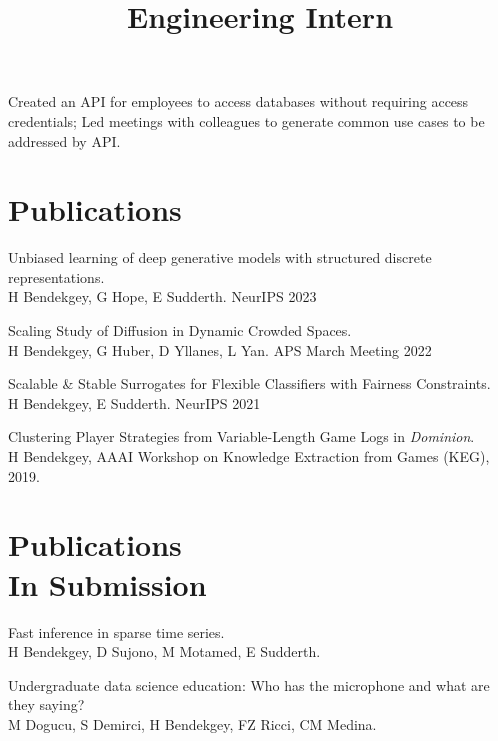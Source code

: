 \documentclass[margin]{res}
\begin{document}
\begin{resume}
\location{}
\title{\textbf{Engineering Intern}}
\begin{position}
Created an API for employees to access databases without requiring access credentials;
Led meetings with colleagues to generate common use cases to be addressed by API.\end{position}



\section{Publications}
\par
Unbiased learning of deep generative models with structured discrete \\representations. \\ H Bendekgey, G Hope, E Sudderth. NeurIPS 2023

Scaling Study of Diffusion in Dynamic Crowded Spaces. \\H Bendekgey, G Huber, D Yllanes, L Yan. APS March Meeting 2022

Scalable \& Stable Surrogates for Flexible Classifiers with Fairness Constraints. \\ H Bendekgey, E Sudderth. NeurIPS 2021

Clustering Player Strategies from Variable-Length Game Logs in \emph{Dominion}.\\ H Bendekgey, AAAI Workshop on Knowledge Extraction from Games (KEG), 2019.

\section{Publications\\ In Submission}


Fast inference in sparse time series. \\ {H Bendekgey}, D Sujono, M Motamed, E Sudderth. 

Undergraduate data science education: Who has the microphone and what are they saying?\\
M Dogucu, S Demirci, H Bendekgey, FZ Ricci, CM Medina. 


\end{resume}
\end{document}
